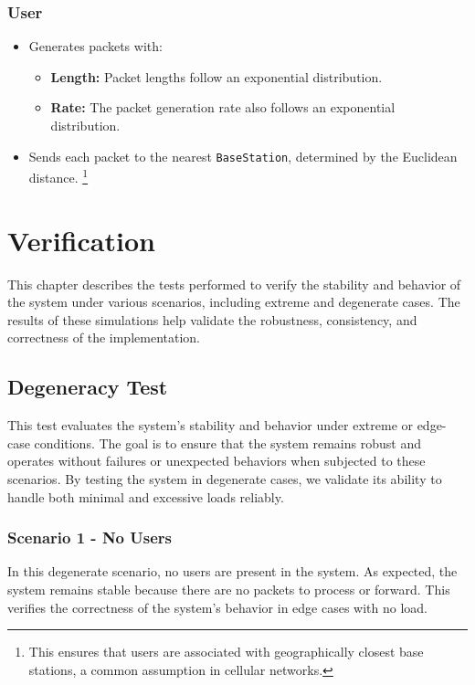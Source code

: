 \documentclass{report}
\begin{document}
\subsection{User}
\begin{itemize}
    \item Generates packets with:
    \begin{itemize}
        \item \textbf{Length:} Packet lengths follow an exponential distribution.
        \item \textbf{Rate:} The packet generation rate also follows an exponential distribution.
    \end{itemize}
    \item Sends each packet to the nearest \texttt{BaseStation}, determined by the Euclidean distance.%
    \footnote{This ensures that users are associated with geographically closest base stations, a common assumption in cellular networks.}
\end{itemize}

\chapter{Verification}
This chapter describes the tests performed to verify the stability and behavior of the system under various scenarios, including extreme and degenerate cases.
The results of these simulations help validate the robustness, consistency, and correctness of the implementation.

\section{Degeneracy Test}
This test evaluates the system's stability and behavior under extreme or edge-case conditions. The goal is to ensure that the system remains robust and operates without failures or unexpected behaviors when subjected to these scenarios.
By testing the system in degenerate cases, we validate its ability to handle both minimal and excessive loads reliably.

\subsection{Scenario 1 - No Users}
In this degenerate scenario, no users are present in the system. As expected, the system remains stable because there are no packets to process or forward. This verifies the correctness of the system's behavior in edge cases with no load.
\end{document}
